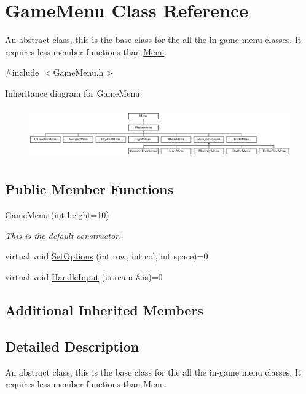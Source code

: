 \hypertarget{classGameMenu}{\section{Game\-Menu Class Reference}
\label{classGameMenu}
}


An abstract class, this is the base class for the all the in-\/game menu classes. It requires less member functions than \hyperlink{classMenu}{Menu}.  




{\ttfamily \#include $<$Game\-Menu.\-h$>$}

Inheritance diagram for Game\-Menu\-:\begin{figure}[H]
\begin{center}
\leavevmode
\includegraphics[height=2.222222cm]{classGameMenu}
\end{center}
\end{figure}
\subsection*{Public Member Functions}
\begin{DoxyCompactItemize}
\item 
\hyperlink{classGameMenu_aee692d042333761f688de3fbdbb89c67}{Game\-Menu} (int height=10)
\begin{DoxyCompactList}\small\item\em This is the default constructor. \end{DoxyCompactList}\item 
virtual void \hyperlink{classGameMenu_ac32ff465c5a4f30979e8851fa21cb230}{Set\-Options} (int row, int col, int space)=0
\item 
virtual void \hyperlink{classGameMenu_a02ba09feedece5773f44ba865ccffb42}{Handle\-Input} (istream \&is)=0
\end{DoxyCompactItemize}
\subsection*{Additional Inherited Members}


\subsection{Detailed Description}
An abstract class, this is the base class for the all the in-\/game menu classes. It requires less member functions than \hyperlink{classMenu}{Menu}. 

